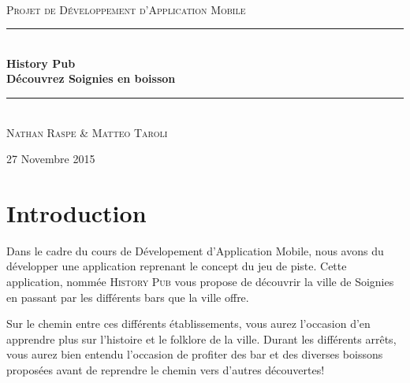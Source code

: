 \documentclass[11pt]{scrreprt}
\begin{document}
    \renewcommand{\labelitemi}{$\bullet$}
    \renewcommand{\labelitemii}{$\circ$}
    \begin{titlepage}
        \begin{center}
            ~\\[8cm]

            \textsc{\Large Projet de Développement d'Application Mobile}\\[0.5cm]

            \rule{\textwidth}{1pt} \\[0.4cm]
            { \bfseries \Huge{History Pub}\\ \Large{Découvrez Soignies en boisson}\\[0.4cm]}

            \rule{\textwidth}{1pt} \\[1.5cm]

            \textsc{Nathan Raspe \& Matteo Taroli}

            \vfill

            {\large 27 Novembre 2015}
            \vfill
        \end{center}
    \end{titlepage}

    \tableofcontents
    \renewcommand\listfigurename{Table des illustrations}
    \listoffigures
    \pagebreak

    \chapter{Introduction}
    Dans le cadre du cours de Dévelopement d'Application Mobile, nous avons du développer une application reprenant le concept du jeu de piste. Cette application, nommée \textsc{History Pub} vous propose de découvrir la ville de Soignies en passant par les différents bars que la ville offre.

    Sur le chemin entre ces différents établissements, vous aurez l'occasion d'en apprendre plus sur l'histoire et le folklore de la ville. Durant les différents arrêts, vous aurez bien entendu l'occasion de profiter des bar et des diverses boissons proposées avant de reprendre le chemin vers d'autres découvertes!
\end{document}
